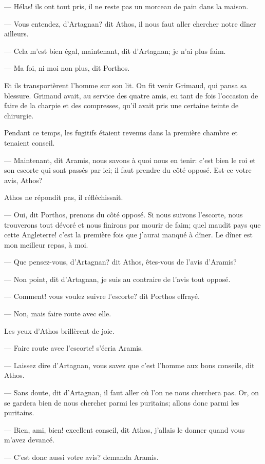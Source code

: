 — Hélas! ils ont tout pris, il ne reste pas un morceau de pain dans la maison.

— Vous entendez, d'Artagnan? dit Athos, il nous faut aller chercher notre dîner ailleurs.

— Cela m'est bien égal, maintenant, dit d'Artagnan; je n'ai plus faim.

— Ma foi, ni moi non plus, dit Porthos.

Et ils transportèrent l'homme sur son lit. On fit venir Grimaud, qui pansa sa blessure. Grimaud avait, au service des quatre amis, eu tant de fois l'occasion de faire de la charpie et des compresses, qu'il avait pris une certaine teinte de chirurgie.

Pendant ce temps, les fugitifs étaient revenus dans la première chambre et tenaient conseil.

— Maintenant, dit Aramis, nous savons à quoi nous en tenir: c'est bien le roi et son escorte qui sont passés par ici; il faut prendre du côté opposé. Est-ce votre avis, Athos?

Athos ne répondit pas, il réfléchissait.

— Oui, dit Porthos, prenons du côté opposé. Si nous suivons l'escorte, nous trouverons tout dévoré et nous finirons par mourir de faim; quel maudit pays que cette Angleterre! c'est la première fois que j'aurai manqué à dîner. Le dîner est mon meilleur repas, à moi.

— Que pensez-vous, d'Artagnan? dit Athos, êtes-vous de l'avis d'Aramis?

— Non point, dit d'Artagnan, je suis au contraire de l'avis tout opposé.

— Comment! vous voulez suivre l'escorte? dit Porthos effrayé.

— Non, mais faire route avec elle.

Les yeux d'Athos brillèrent de joie.

— Faire route avec l'escorte! s'écria Aramis.

— Laissez dire d'Artagnan, vous savez que c'est l'homme aux bons conseils, dit Athos.

— Sans doute, dit d'Artagnan, il faut aller où l'on ne nous cherchera pas. Or, on se gardera bien de nous chercher parmi les puritains; allons donc parmi les puritains.

— Bien, ami, bien! excellent conseil, dit Athos, j'allais le donner quand vous m'avez devancé.

— C'est donc aussi votre avis? demanda Aramis.

